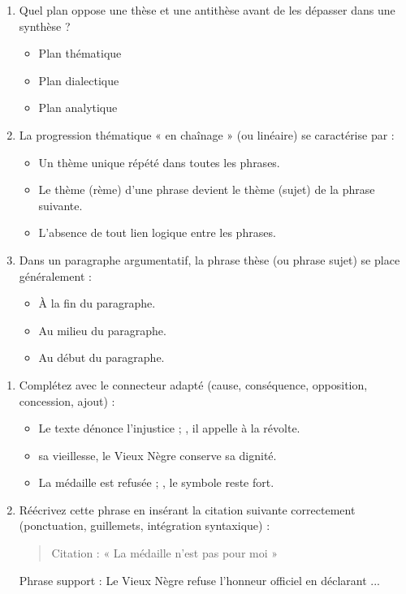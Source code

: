 \documentclass[11pt]{article}
\begin{document}
\begin{exercice}
\begin{enumerate}
    \item Quel plan oppose une thèse et une antithèse avant de les dépasser dans une synthèse ?
    \begin{itemize}
        \item[A.] Plan thématique
        \item[B.] Plan dialectique
        \item[C.] Plan analytique
    \end{itemize}
    \item La progression thématique « en chaînage » (ou linéaire) se caractérise par :
    \begin{itemize}
        \item[A.] Un thème unique répété dans toutes les phrases.
        \item[B.] Le thème (rème) d'une phrase devient le thème (sujet) de la phrase suivante.
        \item[C.] L'absence de tout lien logique entre les phrases.
    \end{itemize}
    \item Dans un paragraphe argumentatif, la phrase thèse (ou phrase sujet) se place généralement :
    \begin{itemize}
        \item[A.] À la fin du paragraphe.
        \item[B.] Au milieu du paragraphe.
        \item[C.] Au début du paragraphe.
    \end{itemize}
\end{enumerate}
\end{exercice}

\begin{exercice}
\begin{enumerate}
    \item Complétez avec le connecteur adapté (cause, conséquence, opposition, concession, ajout) :
    \begin{itemize}
        \item[•] Le texte dénonce l'injustice ; \underline{\hspace{4cm}}, il appelle à la révolte.
        \item[•] \underline{\hspace{4cm}} sa vieillesse, le Vieux Nègre conserve sa dignité.
        \item[•] La médaille est refusée ; \underline{\hspace{4cm}}, le symbole reste fort.
    \end{itemize}
    \item Réécrivez cette phrase en insérant la citation suivante correctement (ponctuation, guillemets, intégration syntaxique) :
    \begin{quote}
        Citation : « La médaille n'est pas pour moi »
    \end{quote}
    Phrase support : Le Vieux Nègre refuse l'honneur officiel en déclarant ...
\end{enumerate}
\end{exercice}
\end{document}
